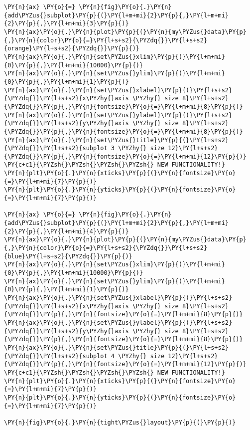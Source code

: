 \begin{tcolorbox}[breakable, size=fbox, boxrule=1pt, pad at break*=1mm,colback=cellbackground, colframe=cellborder]
\begin{Verbatim}[commandchars=\\\{\}]
\PY{n}{ax} \PY{o}{=} \PY{n}{fig}\PY{o}{.}\PY{n}{add\PYZus{}subplot}\PY{p}{(}\PY{l+m+mi}{2}\PY{p}{,}\PY{l+m+mi}{2}\PY{p}{,}\PY{l+m+mi}{3}\PY{p}{)}
\PY{n}{ax}\PY{o}{.}\PY{n}{plot}\PY{p}{(}\PY{n}{my\PYZus{}data}\PY{p}{,}\PY{n}{color}\PY{o}{=}\PY{l+s+s2}{\PYZdq{}}\PY{l+s+s2}{orange}\PY{l+s+s2}{\PYZdq{}}\PY{p}{)}
\PY{n}{ax}\PY{o}{.}\PY{n}{set\PYZus{}xlim}\PY{p}{(}\PY{l+m+mi}{0}\PY{p}{,}\PY{l+m+mi}{10000}\PY{p}{)}
\PY{n}{ax}\PY{o}{.}\PY{n}{set\PYZus{}ylim}\PY{p}{(}\PY{l+m+mi}{0}\PY{p}{,}\PY{l+m+mi}{1}\PY{p}{)}
\PY{n}{ax}\PY{o}{.}\PY{n}{set\PYZus{}xlabel}\PY{p}{(}\PY{l+s+s2}{\PYZdq{}}\PY{l+s+s2}{x\PYZhy{}axis \PYZhy{} size 8}\PY{l+s+s2}{\PYZdq{}}\PY{p}{,}\PY{n}{fontsize}\PY{o}{=}\PY{l+m+mi}{8}\PY{p}{)}
\PY{n}{ax}\PY{o}{.}\PY{n}{set\PYZus{}ylabel}\PY{p}{(}\PY{l+s+s2}{\PYZdq{}}\PY{l+s+s2}{y\PYZhy{}axis \PYZhy{} size 8}\PY{l+s+s2}{\PYZdq{}}\PY{p}{,}\PY{n}{fontsize}\PY{o}{=}\PY{l+m+mi}{8}\PY{p}{)}
\PY{n}{ax}\PY{o}{.}\PY{n}{set\PYZus{}title}\PY{p}{(}\PY{l+s+s2}{\PYZdq{}}\PY{l+s+s2}{subplot 3 \PYZhy{} size 12}\PY{l+s+s2}{\PYZdq{}}\PY{p}{,}\PY{n}{fontsize}\PY{o}{=}\PY{l+m+mi}{12}\PY{p}{)}
\PY{c+c1}{\PYZsh{}\PYZsh{}\PYZsh{}\PYZsh{} NEW FUNCTIONALITY!}
\PY{n}{plt}\PY{o}{.}\PY{n}{xticks}\PY{p}{(}\PY{n}{fontsize}\PY{o}{=}\PY{l+m+mi}{7}\PY{p}{)}
\PY{n}{plt}\PY{o}{.}\PY{n}{yticks}\PY{p}{(}\PY{n}{fontsize}\PY{o}{=}\PY{l+m+mi}{7}\PY{p}{)}

\PY{n}{ax} \PY{o}{=} \PY{n}{fig}\PY{o}{.}\PY{n}{add\PYZus{}subplot}\PY{p}{(}\PY{l+m+mi}{2}\PY{p}{,}\PY{l+m+mi}{2}\PY{p}{,}\PY{l+m+mi}{4}\PY{p}{)}
\PY{n}{ax}\PY{o}{.}\PY{n}{plot}\PY{p}{(}\PY{n}{my\PYZus{}data}\PY{p}{,}\PY{n}{color}\PY{o}{=}\PY{l+s+s2}{\PYZdq{}}\PY{l+s+s2}{blue}\PY{l+s+s2}{\PYZdq{}}\PY{p}{)}
\PY{n}{ax}\PY{o}{.}\PY{n}{set\PYZus{}xlim}\PY{p}{(}\PY{l+m+mi}{0}\PY{p}{,}\PY{l+m+mi}{10000}\PY{p}{)}
\PY{n}{ax}\PY{o}{.}\PY{n}{set\PYZus{}ylim}\PY{p}{(}\PY{l+m+mi}{0}\PY{p}{,}\PY{l+m+mi}{1}\PY{p}{)}
\PY{n}{ax}\PY{o}{.}\PY{n}{set\PYZus{}xlabel}\PY{p}{(}\PY{l+s+s2}{\PYZdq{}}\PY{l+s+s2}{x\PYZhy{}axis \PYZhy{} size 8}\PY{l+s+s2}{\PYZdq{}}\PY{p}{,}\PY{n}{fontsize}\PY{o}{=}\PY{l+m+mi}{8}\PY{p}{)}
\PY{n}{ax}\PY{o}{.}\PY{n}{set\PYZus{}ylabel}\PY{p}{(}\PY{l+s+s2}{\PYZdq{}}\PY{l+s+s2}{y\PYZhy{}axis \PYZhy{} size 8}\PY{l+s+s2}{\PYZdq{}}\PY{p}{,}\PY{n}{fontsize}\PY{o}{=}\PY{l+m+mi}{8}\PY{p}{)}
\PY{n}{ax}\PY{o}{.}\PY{n}{set\PYZus{}title}\PY{p}{(}\PY{l+s+s2}{\PYZdq{}}\PY{l+s+s2}{subplot 4 \PYZhy{} size 12}\PY{l+s+s2}{\PYZdq{}}\PY{p}{,}\PY{n}{fontsize}\PY{o}{=}\PY{l+m+mi}{12}\PY{p}{)}
\PY{c+c1}{\PYZsh{}\PYZsh{}\PYZsh{}\PYZsh{} NEW FUNCTIONALITY!}
\PY{n}{plt}\PY{o}{.}\PY{n}{xticks}\PY{p}{(}\PY{n}{fontsize}\PY{o}{=}\PY{l+m+mi}{7}\PY{p}{)}
\PY{n}{plt}\PY{o}{.}\PY{n}{yticks}\PY{p}{(}\PY{n}{fontsize}\PY{o}{=}\PY{l+m+mi}{7}\PY{p}{)}

\PY{n}{fig}\PY{o}{.}\PY{n}{tight\PYZus{}layout}\PY{p}{(}\PY{p}{)}
\end{Verbatim}
\end{tcolorbox}

